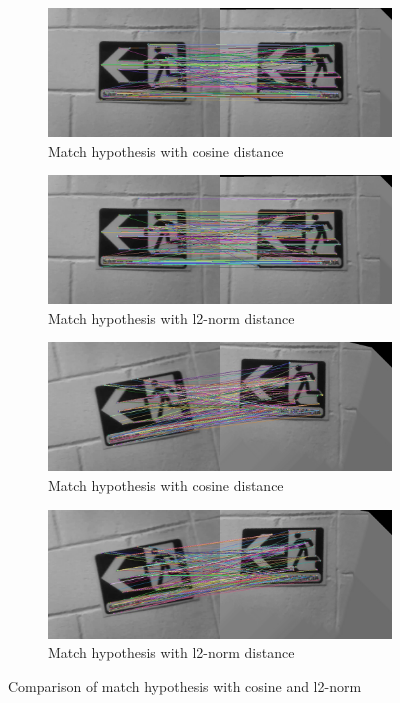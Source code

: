 \begin{figure}[!h]
	\centering
	\begin{subfigure}{0.5\textwidth}
	  \centering
	  \includegraphics[width=0.9\linewidth]{figs/affine_100_cosine_30_8_False_p2-1-1_6-7.jpg}
	  \caption{Match hypothesis with cosine distance}
	\end{subfigure}%
	\begin{subfigure}{0.5\textwidth}
	  \centering
	  \includegraphics[width=0.9\linewidth]{figs/affine_200_l2-norm_30_8_False_p2-1-1_6-7.jpg}
	  \caption{Match hypothesis with l2-norm distance}
	\end{subfigure}
	\begin{subfigure}{0.5\textwidth}
        \centering
        \includegraphics[width=0.9\linewidth]{figs/affine_100_cosine_30_8_False_p2-1-1_139-140.jpg}
        \caption{Match hypothesis with cosine distance}
      \end{subfigure}%
      \begin{subfigure}{0.5\textwidth}
        \centering
        \includegraphics[width=0.9\linewidth]{figs/affine_200_l2-norm_30_8_False_p2-1-1_139-140.jpg}
        \caption{Match hypothesis with l2-norm distance}
      \end{subfigure}%
       \caption{Comparison of match hypothesis with cosine and l2-norm}
	\label{fig:diff-l2-cosine}
\end{figure}

